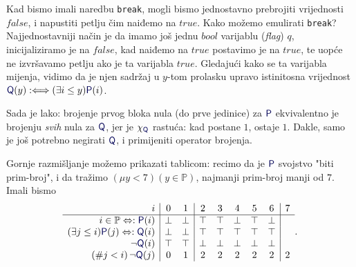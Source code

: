 Kad bismo imali naredbu \texttt{break}, mogli bismo jednostavno prebrojiti vrijednosti $\mathit{false}$, i napustiti petlju čim naiđemo na $\mathit{true}$. Kako možemo emulirati \texttt{break}? Najjednostavniji način je da imamo još jednu $bool$ varijablu (\emph{flag}) $q$, inicijaliziramo je na $\mathit{false}$, kad naiđemo na $\mathit{true}$ postavimo je na $\mathit{true}$, te uopće ne izvršavamo petlju ako je ta varijabla $\mathit{true}$. Gledajući kako se ta varijabla mijenja, vidimo da je njen sadržaj u $y$-tom prolasku upravo istinitosna vrijednost $\f Q(y):\Longleftrightarrow(\exists i\le y)\f P(i)$.

Sada je lako: brojenje prvog bloka nula (do prve jedinice) za $\f P$ ekvivalentno je brojenju \emph{svih} nula za $\f Q$, jer je $\chi_{\f Q}$ rastuća: kad postane $1$, ostaje $1$. Dakle, samo je još potrebno negirati $\f Q$, i primijeniti operator brojenja.

Gornje razmišljanje možemo prikazati tablicom: recimo da je $\f P$ svojstvo "biti prim-broj", i da tražimo $(\mu y<7)(y\in\mathbb P)$, najmanji prim-broj manji od $7$. Imali bismo
\begin{equation}
    \begin{array}{r|cc|ccccc|c}
i & 0 & 1 & 2 & 3 & 4 & 5 & 6 & 7 \\\hline
i\in\mathbb P\Leftrightarrow:\f P(i) & \bot & \bot & \top & \top & \bot & \top & \bot  \\
(\exists j\le i)\f P(j)\Leftrightarrow:\f Q(i) & \bot & \bot & \top & \top & \top & \top & \top \\
\lnot\f Q(i) & \top & \top & \bot & \bot & \bot & \bot & \bot\\
(\# j<i)\,\lnot\f Q(j) & 0 & 1 & 2 & 2 & 2 & 2 & 2 & 2
\end{array}\text.
\end{equation}

